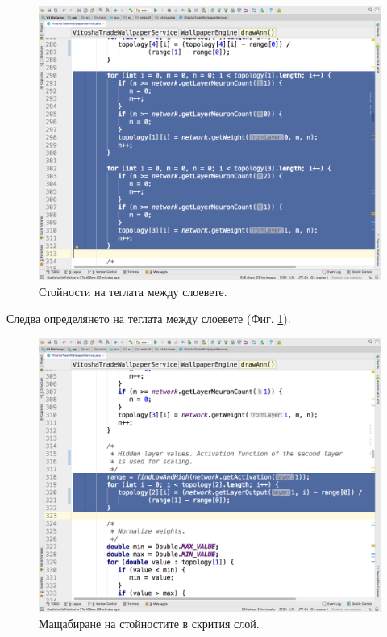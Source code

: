 \documentclass[book,14pt,oneside,openany]{memoir}
\begin{document}
\begin{figure}[h]
  \centering
  \includegraphics[height=0.45\pdfpageheight]{./images/pic0060.png}
  \caption{Стойности на теглата между слоевете.}
\label{fig:pic0060}
\end{figure}
\FloatBarrier

Следва определянето на теглата между слоевете (Фиг. \ref{fig:pic0060}).

\begin{figure}[h]
  \centering
  \includegraphics[height=0.45\pdfpageheight]{./images/pic0061.png}
  \caption{Мащабиране на стойностите в скрития слой.}
\label{fig:pic0061}
\end{figure}
\FloatBarrier
\end{document}
